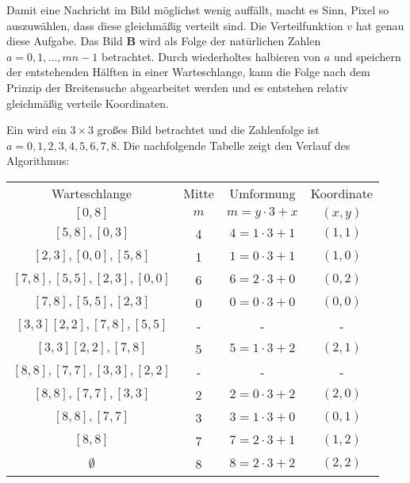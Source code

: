 \noindent
Damit eine Nachricht im Bild möglichst wenig auffällt, macht es Sinn, Pixel
so auszuwählen, dass diese gleichmäßig verteilt sind. Die Verteilfunktion $v$ hat genau diese
Aufgabe. Das Bild $\mathbf{B}$ wird als Folge der natürlichen Zahlen
$a = 0,1,\ldots,mn - 1$ betrachtet. Durch wiederholtes halbieren von $a$ und
speichern der entstehenden Hälften in einer Warteschlange, kann die Folge nach
dem Prinzip der Breitensuche abgearbeitet werden und es entstehen relativ gleichmäßig
verteile Koordinaten.
\begin{example}
  Ein wird ein $3 \times 3$ großes Bild betrachtet und die Zahlenfolge ist
  $a = 0,1,2,3,4,5,6,7,8$. Die nachfolgende Tabelle zeigt den Verlauf des Algorithmus:
  \begin{center}
    \begin{tabular}{cccc}
      \multicolumn{1}{c}{Warteschlange} & Mitte & Umformung           & Koordinate \\
      $[0,8]$                           & $m$   & $m = y \cdot 3 + x$ & $(x,y)$    \\
      $[5,8],[0,3]$                     & 4     & $4 = 1 \cdot 3 + 1$ & $(1,1)$    \\
      $[2,3],[0,0],[5,8]$               & 1     & $1 = 0 \cdot 3 + 1$ & $(1,0)$    \\
      $[7,8],[5,5],[2,3],[0,0]$         & 6     & $6 = 2 \cdot 3 + 0$ & $(0,2)$    \\
      $[7,8],[5,5],[2,3]$               & 0     & $0 = 0 \cdot 3 + 0$ & $(0,0)$    \\
      $[3,3][2,2],[7,8],[5,5]$          & -     & -                   & -          \\
      $[3,3][2,2],[7,8]$                & 5     & $5 = 1 \cdot 3 + 2$ & $(2,1)$    \\
      $[8,8],[7,7],[3,3],[2,2]$         & -     & -                   & -          \\
      $[8,8],[7,7],[3,3]$               & 2     & $2 = 0 \cdot 3 + 2$ & $(2,0)$    \\
      $[8,8],[7,7]$                     & 3     & $3 = 1 \cdot 3 + 0$ & $(0,1)$    \\
      $[8,8]$                           & 7     & $7 = 2 \cdot 3 + 1$ & $(1,2)$    \\
      $\emptyset$                       & 8     & $8 = 2 \cdot 3 + 2$ & $(2,2)$
    \end{tabular}
  \end{center}
\end{example}

